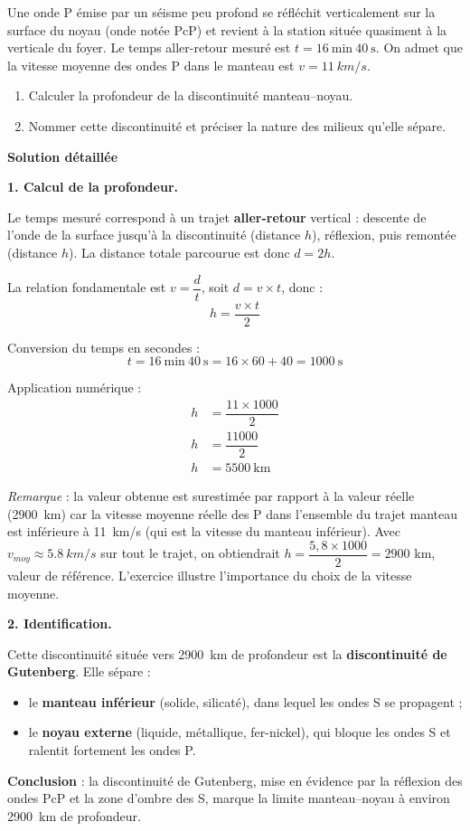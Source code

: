 \documentclass[11pt]{article}
\begin{document}
\begin{exoresolu}
Une onde P émise par un séisme peu profond se réfléchit verticalement sur la surface du noyau (onde notée PcP) et revient à la station située quasiment à la verticale du foyer. Le temps aller-retour mesuré est $t = 16~\text{min}~40~\text{s}$. On admet que la vitesse moyenne des ondes P dans le manteau est $v = \SI{11}{km/s}$.
\begin{enumerate}
\item Calculer la profondeur de la discontinuité manteau--noyau.
\item Nommer cette discontinuité et préciser la nature des milieux qu'elle sépare.
\end{enumerate}
\tcblower
\textbf{Solution détaillée}

\textbf{1. Calcul de la profondeur.}

Le temps mesuré correspond à un trajet \textbf{aller-retour} vertical : descente de l'onde de la surface jusqu'à la discontinuité (distance $h$), réflexion, puis remontée (distance $h$). La distance totale parcourue est donc $d = 2h$.

La relation fondamentale est $v = \dfrac{d}{t}$, soit $d = v \times t$, donc :
\[ h = \dfrac{v \times t}{2} \]

Conversion du temps en secondes :
\[ t = 16~\text{min}~40~\text{s} = 16 \times 60 + 40 = 1000~\text{s} \]

Application numérique :
\begin{align*}
h &= \dfrac{11 \times 1000}{2} \\
h &= \dfrac{11000}{2} \\
h &= 5500~\text{km}
\end{align*}

\textit{Remarque} : la valeur obtenue est surestimée par rapport à la valeur réelle (\SI{2900}{km}) car la vitesse moyenne réelle des P dans l'ensemble du trajet manteau est inférieure à \SI{11}{km/s} (qui est la vitesse du manteau inférieur). Avec $v_{moy} \approx \SI{5,8}{km/s}$ sur tout le trajet, on obtiendrait $h = \dfrac{5{,}8 \times 1000}{2} = 2900$ km, valeur de référence. L'exercice illustre l'importance du choix de la vitesse moyenne.

\textbf{2. Identification.}

Cette discontinuité située vers \SI{2900}{km} de profondeur est la \textbf{discontinuité de Gutenberg}. Elle sépare :
\begin{itemize}
\item le \textbf{manteau inférieur} (solide, silicaté), dans lequel les ondes S se propagent ;
\item le \textbf{noyau externe} (liquide, métallique, fer-nickel), qui bloque les ondes S et ralentit fortement les ondes P.
\end{itemize}

\textbf{Conclusion} : la discontinuité de Gutenberg, mise en évidence par la réflexion des ondes PcP et la zone d'ombre des S, marque la limite manteau--noyau à environ \SI{2900}{km} de profondeur.
\end{exoresolu}
\end{document}
